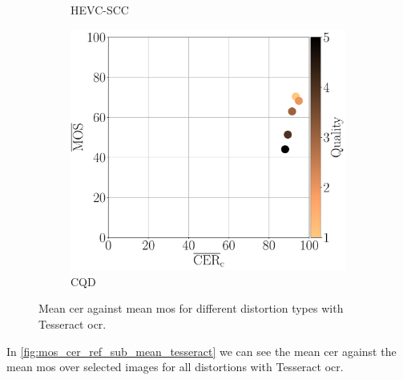 \begin{figure}[h]
\begin{subfigure}[b]{0.3\textwidth}
        \caption{HEVC-SCC}
        \label{fig:mos_cer_ref_mean_tess_HEVC-SCC}
    \end{subfigure}
    \hfill
    \begin{subfigure}[b]{0.3\textwidth}
        \includegraphics[width=\textwidth]{../../images/analyze/mos_cer_ref_mean_tess_CQD.pdf}
        \caption{CQD}
        \label{fig:mos_cer_ref_mean_tess_CQD}
    \end{subfigure}
    \caption{Mean \gls{cer} against mean \gls{mos} for different distortion types with Tesseract \gls{ocr}.}
\label{fig:mos_cer_ref_mean_tess}
\end{figure}

In \autoref{fig:mos_cer_ref_sub_mean_tesseract} we can see the mean \gls{cer} against the mean \gls{mos} over selected images for all distortions with Tesseract \gls{ocr}.


